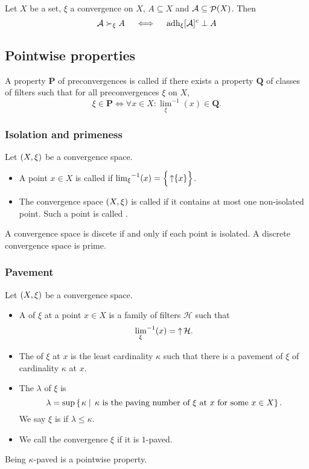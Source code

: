 \begin{proposition}
Let $X$ be a set, $\xi$ a convergence on $X$, $A\subseteq X$ and $\mathcal{A}\subseteq \mathop{\mathcal{P}}(X)$. Then
\[ \mathcal{A} \succ_\xi A \quad\iff\quad \operatorname{adh}_\xi [\mathcal{A}]^c \perp A \]
\end{proposition}


\subsection{Pointwise properties}
\begin{definition}
A property $\mathbf{P}$ of preconvergences is called  if there exists a property $\mathbf{Q}$ of classes of filters such that for all preconvergences $\xi$ on $X$,
\[ \xi \in \mathbf{P} \iff \forall x\in X: {\lim_\xi}^{-1}(x) \in \mathbf{Q}. \]
\end{definition}

\subsubsection{Isolation and primeness}
\begin{definition}
Let $\left( X,\xi \right)$ be a convergence space.
\begin{itemize}
\item A point $x\in X$ is called  if ${\lim_\xi}^{-1}(x) = \Big\{ \mathop{\uparrow}\{x\} \Big\}$.
\item The convergence space $\left( X,\xi \right)$ is called  if it contains at most one non-isolated point. Such a point is called .
\end{itemize}
\end{definition}

A convergence space is discete if and only if each point is isolated. A discrete convergence space is prime.

\subsubsection{Pavement}
\begin{definition}
Let $\left( X,\xi \right)$ be a convergence space.
\begin{itemize}
\item A  of $\xi$ at a point $x\in X$ is a family of filters $\mathcal{H}$ such that
\[ {\lim_\xi}^{-1}(x) = \mathop{\uparrow}\mathcal{H}. \]
\item The  of $\xi$ at $x$ is the least cardinality $\kappa$ such that there is a pavement of $\xi$ of cardinality $\kappa$ at $x$.
\item The  $\lambda$ of $\xi$ is
\[ \lambda = \sup\left\{\left. \kappa \;\right|\; \text{$\kappa$ is the paving number of $\xi$ at $x$ for some $x\in X$} \right\}. \]
We say $\xi$ is  if $\lambda \leq \kappa$.
\item We call the convergence $\xi$  if it is $1$-paved.
\end{itemize}
\end{definition}
Being $\kappa$-paved is a pointwise property.

